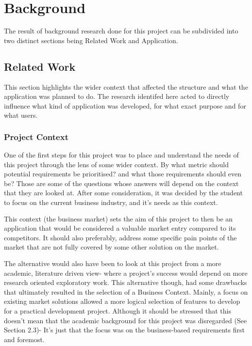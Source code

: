 \section{Background}

The result of background research done for this project can be subdivided into two distinct sections being Related Work and Application.

\subsection{Related Work}
This section highlights the wider context that affected the structure and what the application was planned to do. The research identifed here acted to directly influence what kind of application was developed, for what exact purpose and for what users.

\subsubsection{Project Context}
One of the first steps for this project was to place and understand the needs of this project through the lens of some wider context. By what metric should potential requirements be prioritised? and what those requirements should even be? Those are some of the questions whose answers will depend on the context that they are looked at. After some consideration, it was decided by the student to focus on the current business industry, and it’s needs as this context.

\begin{displayquote}
    This context (the business market) sets the aim of this project to then be an application that would be considered a valuable market entry compared to its competitors. It should also preferably, address some specific pain points of the market that are not fully covered by some other solution on the market.
\end{displayquote}

The alternative would also have been to look at this project from a more academic, literature driven view- where a project’s success would depend on more research oriented exploratory work. This alternative though, had some drawbacks that ultimately resulted in the selection of a Business Context. Mainly, a focus on existing market solutions allowed a more logical selection of features to develop for a practical development project. Although it should be stressed that this doesn’t mean that the academic background for this project was disregarded (See Section 2.3)- It’s just that the focus was on the business-based requirements first and foremost.


